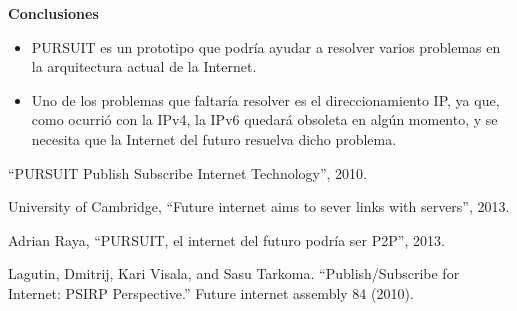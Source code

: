 \documentclass[a4paper,12pt]{article}
\begin{document}
\newpage

\begin{large}
 \textbf{Conclusiones}
\end{large}

\begin{itemize}
 \item PURSUIT es un prototipo que podría ayudar a resolver varios problemas en la arquitectura actual de la Internet.
 \item Uno de los problemas que faltaría resolver es el direccionamiento IP, ya que, como ocurrió con la IPv4, la IPv6 quedará
 obsoleta en algún momento, y se necesita que la Internet del futuro resuelva dicho problema.
\end{itemize}




\begin{thebibliography}{1}

``PURSUIT Publish Subscribe Internet Technology'', 2010.

University of Cambridge, ``Future internet aims to sever links with servers'', 2013.

Adrian Raya, ``PURSUIT, el internet del futuro podría ser P2P'', 2013.

Lagutin, Dmitrij, Kari Visala, and Sasu Tarkoma. ``Publish/Subscribe for Internet: PSIRP Perspective.'' Future internet assembly 84 (2010).

\end{thebibliography}
\end{document}

